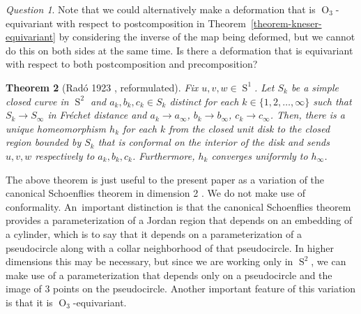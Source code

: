 \documentclass[11pt]{article}
\numberwithin{equation}{section}
\newtheorem{theorem}{Theorem}[subsection]
\theoremstyle{remark}
\newtheorem{question}[theorem]{Question}
\DeclareMathOperator{\orth}{O}
\DeclareMathOperator{\sphere}{S}
\begin{document}
\begin{question}
Note that we could alternatively make a deformation that is $\orth_3$\nobreakdash-equivariant with respect to postcomposition in Theorem~\ref{theorem-kneser-equivariant} by considering the inverse of the map being deformed, but we cannot do this on both sides at the same time. Is there a deformation that is equivariant with respect to both postcomposition and precomposition?
\end{question}

\begin{theorem}[Radó 1923 \cite{rado1923representation}, reformulated]\label{theorem-conformal}
Fix $u,v,w \in \sphere^1$.
Let $S_k$ be a simple closed curve in $\sphere^2$ and $a_k,b_k,c_k \in S_k$ distinct for each $k \in \{1,2,\dots,\infty\}$ such that $S_k \to S_\infty$ in Fréchet distance and $a_k \to a_\infty$, $b_k \to b_\infty$, $c_k \to c_\infty$.
Then, there is a unique homeomorphism $h_k$ for each $k$ from the closed unit disk to the closed region bounded by $S_k$ that is conformal on the interior of the disk and sends $u,v,w$
respectively to $a_k,b_k,c_k$.
Furthermore, $h_k$ converges uniformly to $h_\infty$.
\end{theorem}

The above theorem is just useful to the present paper as a variation of the canonical Schoenflies theorem in dimension 2 \cite{gauld1971canonical}. We do not make use of conformality. An~important distinction is that the canonical Schoenflies theorem provides a parameterization of a Jordan region that depends on an embedding of a cylinder, which is to say that it depends on a parameterization of a pseudocircle along with a collar neighborhood of that pseudocircle. In higher dimensions this may be necessary, but since we are working only in $\sphere^2$, we can make use of a parameterization that depends only on a pseudocircle and the image of $3$ points on the pseudocircle.
Another important feature of this variation is that it is $\orth_3$-equivariant.
\end{document}
